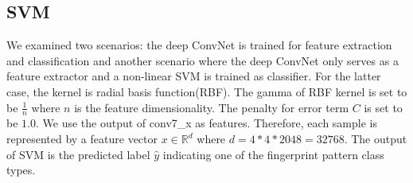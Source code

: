 \subsection{SVM}
\label{sec_svm}
We examined two scenarios: the deep ConvNet is trained for feature extraction and classification and another scenario where the deep ConvNet only serves as a feature extractor and a non-linear SVM is trained as classifier. For the latter case, the kernel is radial basis function(RBF). The gamma of RBF kernel  is set to be $\frac{1}{n}$ where $n$ is the feature dimensionality. The penalty for error term $C$ is set to be $1.0$. 
%
We use the output of  conv7\_x as features. Therefore, each sample is represented by a feature vector $x \in \mathbb{R}^d$ where $d=4*4*2048=32768$. The output of SVM is the predicted label $\hat{y} $ indicating one of the fingerprint pattern class types.
%







